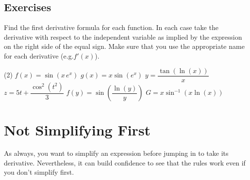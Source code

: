 \documentclass[10pt,oneside,]{book}
\theoremstyle{plain}
\theoremstyle{definition}
\numberwithin{equation}{section}
\newcommand{\fe}[2]{#1\mathopen{}\left(#2\right)\mathclose{}}
\newcommand{\fd}[1]{#1'}
\begin{document}
\subsection[Exercises]{Exercises}\label{exercises-44}
\hypertarget{exercisegroup-94}{\null}Find the first derivative formula for each function.  In each case take the derivative with respect to the independent variable as implied by the expression on the right side of the equal sign.  Make sure that you use the appropriate name for each derivative (e.g.\@ \(\fe{\fd{f}}{x}\)).%
\par
\begin{exercisegroup}(2)
\exercise[1.]\hypertarget{exercise-455}{\null}\(\fe{f}{x}=\fe{\sin}{x\,e^x}\)%
\exercise[2.]\hypertarget{exercise-456}{\null}\(\fe{g}{x}=x\fe{\sin}{e^x}\)%
\exercise[3.]\hypertarget{exercise-457}{\null}\(y=\dfrac{\fe{\tan}{\fe{\ln}{x}}}{x}\)%
\exercise[4.]\hypertarget{exercise-458}{\null}\(z=5t+\dfrac{\fe{\cos^2}{t^2}}{3}\)%
\exercise[5.]\hypertarget{exercise-459}{\null}\(\fe{f}{y}=\fe{\sin}{\dfrac{\fe{\ln}{y}}{y}}\)%
\exercise[6.]\hypertarget{exercise-460}{\null}\(G=x\fe{\sin^{-1}}{x\fe{\ln}{x}}\)%
\end{exercisegroup}
\par\smallskip\noindent
\typeout{************************************************}
\typeout{************************************************}
\section[Not Simplifying First]{Not Simplifying First}\label{section-not-simplifying-first}
As always, you want to simplify an expression before jumping in to take its derivative.  Nevertheless, it can build confidence to see that the rules work even if you don't simplify first.%
\typeout{************************************************}
\typeout{************************************************}
\end{document}

